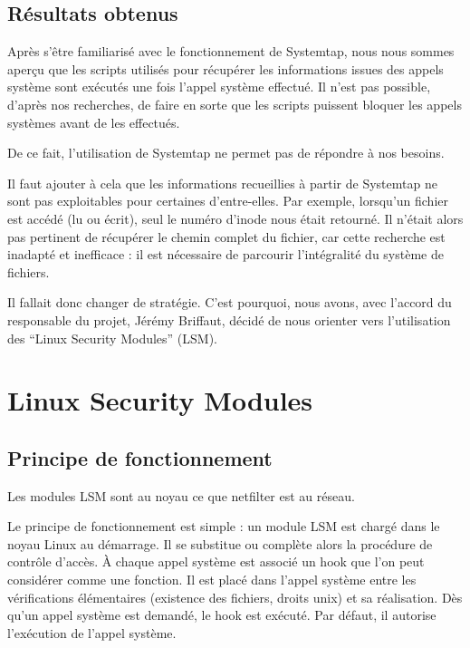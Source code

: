 \documentclass[pdftex,a4paper,titlepage,11pt,openright]{article}
\begin{document}
\newpage

\subsection{Résultats obtenus}

Après s'être familiarisé avec le fonctionnement de Systemtap, nous nous sommes aperçu que les scripts utilisés pour récupérer les informations issues des appels système sont exécutés une fois l'appel système effectué. Il n'est pas possible, d'après nos recherches, de faire en sorte que les scripts puissent bloquer les appels systèmes avant de les effectués.

De ce fait, l'utilisation de Systemtap ne permet pas de répondre à nos besoins.

Il faut ajouter à cela que les informations recueillies à partir de Systemtap ne sont pas exploitables pour certaines d'entre-elles. Par exemple, lorsqu'un fichier est accédé (lu ou écrit), seul le numéro d'inode nous était retourné. Il n'était alors pas pertinent de récupérer le chemin complet du fichier, car cette recherche est inadapté et inefficace : il est nécessaire de parcourir l'intégralité du système de fichiers.

Il fallait donc changer de stratégie. C'est pourquoi, nous avons, avec l'accord du responsable du projet, Jérémy Briffaut, décidé de nous orienter vers l'utilisation des ``Linux Security Modules'' (LSM).

\newpage

\section{Linux Security Modules}

\subsection{Principe de fonctionnement}

Les modules LSM sont au noyau ce que netfilter est au réseau.

Le principe de fonctionnement est simple : un module LSM est chargé dans le noyau Linux au démarrage. Il se substitue ou complète alors la procédure de contrôle d'accès. \`A chaque appel système est associé un hook que l'on peut considérer comme une fonction. Il est placé dans l'appel système entre les vérifications élémentaires (existence des fichiers, droits unix) et sa réalisation. Dès qu'un appel système est demandé, le hook est exécuté. Par défaut, il autorise l'exécution de l'appel système.
\end{document}
